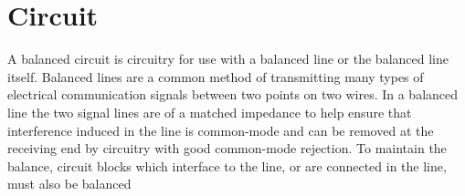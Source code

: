 \chapter{Circuit}
\label{Circuit}

A balanced circuit is circuitry for use with a balanced line or the balanced line itself. Balanced lines are a common method of transmitting many types of electrical communication signals between two points on two wires. In a balanced line the two signal lines are of a matched impedance to help ensure that interference induced in the line is common-mode and can be removed at the receiving end by circuitry with good common-mode rejection. To maintain the balance, circuit blocks which interface to the line, or are connected in the line, must also be balanced